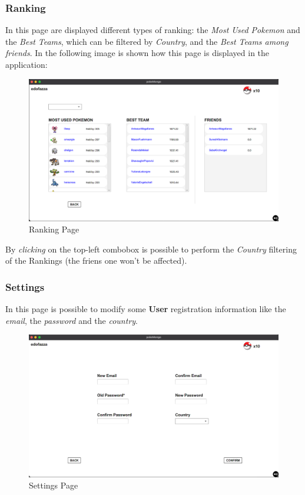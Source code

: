 \subsubsection{Ranking}
In this page are displayed different types of ranking: the \textit{Most Used Pokemon} and the \textit{Best Teams}, which can be filtered by \textit{Country}, and the \textit{Best Teams among friends}. In the following image is shown how this page is displayed in the application:
\begin{figure}[H]
	\centering
	\includegraphics[width=\textwidth]{img/userManual/ranking.png}
	\caption{Ranking Page}
\end{figure}
By \textit{clicking} on the top-left combobox is possible to perform the \textit{Country} filtering of the Rankings (the friens one won't be affected).

\subsubsection{Settings}
In this page is possible to modify some \textbf{User} registration information like the \textit{email}, the \textit{password} and the \textit{country}.
\begin{figure}[H]
	\centering
	\includegraphics[width=\textwidth]{img/userManual/settings.png}
	\caption{Settings Page}
\end{figure}
